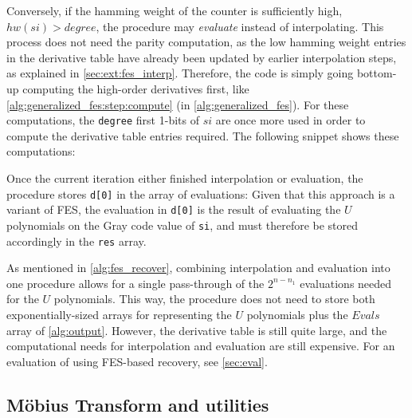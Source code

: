Conversely, if the hamming weight of the counter is sufficiently high, $hw(si) > degree$, the procedure may \textit{evaluate} instead of interpolating. This process does not need the parity computation, as the low hamming weight entries in the derivative table have already been updated by earlier interpolation steps, as explained in \cref{sec:ext:fes_interp}. Therefore, the code is simply going bottom-up computing the high-order derivatives first, like \cref{alg:generalized_fes:step:compute} (in \cref{alg:generalized_fes}). For these computations, the \texttt{degree} first 1-bits of $si$ are once more used in order to compute the derivative table entries required. The following snippet shows these computations:

Once the current iteration either finished interpolation or evaluation, the procedure stores \texttt{d[0]} in the array of evaluations:
Given that this approach is a variant of FES, the evaluation in \texttt{d[0]} is the result of evaluating the $U$ polynomials on the Gray code value of \texttt{si}, and must therefore be stored accordingly in the \texttt{res} array.

As mentioned in \cref{alg:fes_recover}, combining interpolation and evaluation into one procedure allows for a single pass-through of the $2^{n - n_1}$ evaluations needed for the $U$ polynomials. This way, the procedure does not need to store both exponentially-sized arrays for representing the $U$ polynomials plus the $Evals$ array of \cref{alg:output}. However, the derivative table is still quite large, and the computational needs for interpolation and evaluation are still expensive. For an evaluation of using FES-based recovery, see \cref{sec:eval}.

\subsection{Möbius Transform and utilities}
